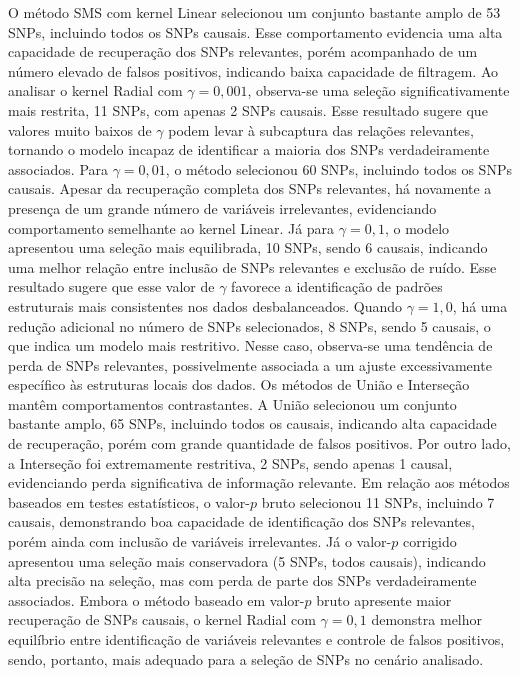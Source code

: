 \documentclass[12pt,a4paper]{article}
\begin{document}
O método SMS com kernel Linear selecionou um conjunto bastante amplo de 53 SNPs, incluindo todos os SNPs causais. Esse comportamento evidencia uma alta capacidade de recuperação dos SNPs relevantes, porém acompanhado de um número elevado de falsos positivos, indicando baixa capacidade de filtragem. Ao analisar o kernel Radial com $\gamma = 0{,}001$, observa-se uma seleção significativamente mais restrita, 11 SNPs, com apenas 2 SNPs causais. Esse resultado sugere que valores muito baixos de $\gamma$ podem levar à subcaptura das relações relevantes, tornando o modelo incapaz de identificar a maioria dos SNPs verdadeiramente associados. Para $\gamma = 0{,}01$, o método selecionou 60 SNPs, incluindo todos os SNPs causais. Apesar da recuperação completa dos SNPs relevantes, há novamente a presença de um grande número de variáveis irrelevantes, evidenciando comportamento semelhante ao kernel Linear. Já para $\gamma = 0{,}1$, o modelo apresentou uma seleção mais equilibrada, 10 SNPs, sendo 6 causais, indicando uma melhor relação entre inclusão de SNPs relevantes e exclusão de ruído. Esse resultado sugere que esse valor de $\gamma$ favorece a identificação de padrões estruturais mais consistentes nos dados desbalanceados. Quando $\gamma = 1{,}0$, há uma redução adicional no número de SNPs selecionados, 8 SNPs, sendo 5 causais, o que indica um modelo mais restritivo. Nesse caso, observa-se uma tendência de perda de SNPs relevantes, possivelmente associada a um ajuste excessivamente específico às estruturas locais dos dados. Os métodos de União e Interseção mantêm comportamentos contrastantes. A União selecionou um conjunto bastante amplo, 65 SNPs, incluindo todos os causais, indicando alta capacidade de recuperação, porém com grande quantidade de falsos positivos. Por outro lado, a Interseção foi extremamente restritiva, 2 SNPs, sendo apenas 1 causal, evidenciando perda significativa de informação relevante. Em relação aos métodos baseados em testes estatísticos, o valor-$p$ bruto selecionou 11 SNPs, incluindo 7 causais, demonstrando boa capacidade de identificação dos SNPs relevantes, porém ainda com inclusão de variáveis irrelevantes. Já o valor-$p$ corrigido apresentou uma seleção mais conservadora (5 SNPs, todos causais), indicando alta precisão na seleção, mas com perda de parte dos SNPs verdadeiramente associados. Embora o método baseado em valor-$p$ bruto apresente maior recuperação de SNPs causais, o kernel Radial com $\gamma = 0{,}1$ demonstra melhor equilíbrio entre identificação de variáveis relevantes e controle de falsos positivos, sendo, portanto, mais adequado para a seleção de SNPs no cenário analisado.
\end{document}
